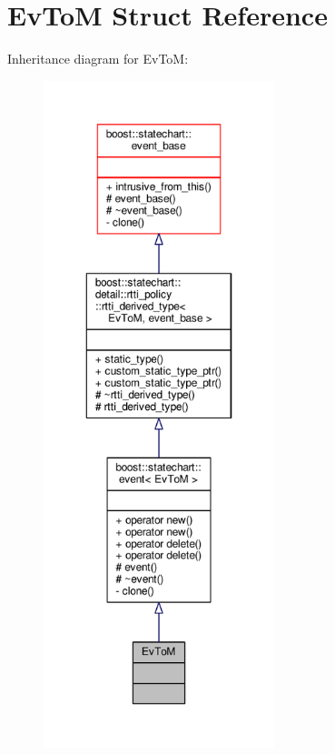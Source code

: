 \hypertarget{struct_ev_to_m}{}\section{Ev\+ToM Struct Reference}
\label{struct_ev_to_m}


Inheritance diagram for Ev\+ToM\+:
\nopagebreak
\begin{figure}[H]
\begin{center}
\leavevmode
\includegraphics[height=550pt]{struct_ev_to_m__inherit__graph}
\end{center}
\end{figure}


